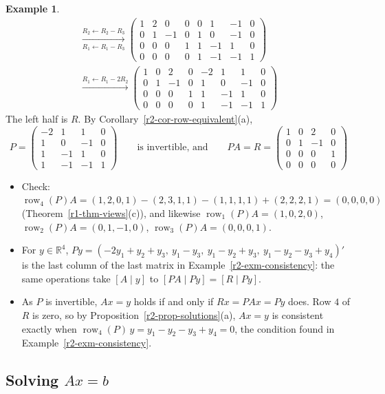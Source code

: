 \documentclass[12pt]{article}
\newcommand{\R}{\mathbb R}
\DeclareMathOperator{\row}{row}
\theoremstyle{definition}
\newtheorem{example}[theorem]{Example}
\begin{document}
\begin{example}
\[\begin{gathered}
\xrightarrow[R_1\leftarrow R_1-R_3]{R_2\leftarrow R_2-R_3}
\left(\begin{array}{cccc|cccc}1&2&0&0&0&1&-1&0\\0&1&-1&0&1&0&-1&0\\0&0&0&1&1&-1&1&0\\0&0&0&0&1&-1&-1&1\end{array}\right)
\\
\xrightarrow{R_1\leftarrow R_1-2R_2}
\left(\begin{array}{cccc|cccc}1&0&2&0&-2&1&1&0\\0&1&-1&0&1&0&-1&0\\0&0&0&1&1&-1&1&0\\0&0&0&0&1&-1&-1&1\end{array}\right)
\end{gathered}
\]
The left half is \(R\). By Corollary~\ref{r2-cor-row-equivalent}(a),
\[
P=\begin{pmatrix}-2&1&1&0\\1&0&-1&0\\1&-1&1&0\\1&-1&-1&1\end{pmatrix}\qquad\text{is invertible, and}\qquad
PA=R=\begin{pmatrix}1&0&2&0\\0&1&-1&0\\0&0&0&1\\0&0&0&0\end{pmatrix}
\]
\begin{itemize}
\item Check: \(\row_4(P)A=(1,2,0,1)-(2,3,1,1)-(1,1,1,1)+(2,2,2,1)=(0,0,0,0)\)
(Theorem~\ref{r1-thm-views}(c)), and likewise \(\row_1(P)A=(1,0,2,0)\), \(\row_2(P)A=(0,1,-1,0)\),
\(\row_3(P)A=(0,0,0,1)\).
\item For \(y\in\R^4\), \(Py=(-2y_1+y_2+y_3,\ y_1-y_3,\ y_1-y_2+y_3,\ y_1-y_2-y_3+y_4)'\) is the last column of the
last matrix in Example~\ref{r2-exm-consistency}: the same operations take \([A\mid y]\) to \([PA\mid Py]=[R\mid Py]\).
\item As \(P\) is invertible, \(Ax=y\) holds if and only if \(Rx=PAx=Py\) does. Row \(4\) of \(R\) is zero, so by
Proposition~\ref{r2-prop-solutions}(a), \(Ax=y\) is consistent exactly when \(\row_4(P)\,y=y_1-y_2-y_3+y_4=0\), the
condition found in Example~\ref{r2-exm-consistency}.
\end{itemize}
\end{example}

\subsection*{Solving \(Ax=b\)}
\end{document}
